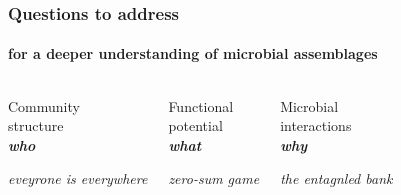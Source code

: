 \documentclass{beamer}
\begin{document}
   \begin{frame}
      \frametitle{Questions to address}
      \framesubtitle{for a deeper understanding of microbial assemblages}
      \begin{singlespace}


         \begin{columns}[onlytextwidth]
            

               \begin{center}

                  Community \\ structure   \\ \textbf{\textit{who}}  

                  \hrulefill

                  \scriptsize \textit{eveyrone is everywhere}

               \end{center}



               \begin{center}

                  Functional \\ potential \\ \textbf{\textit{what}}

                  \hrulefill

                  \scriptsize \textit{zero-sum game}

               \end{center}


               \begin{center}

                  Microbial \\ interactions \\ \textbf{\textit{why}}

                  \hrulefill

                  \scriptsize \textit{the entagnled bank}

               \end{center}
      

         \end{columns}

      \end{singlespace}

   \end{frame}
\end{document}
